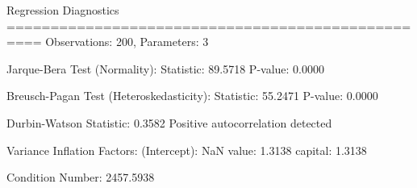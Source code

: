 
Regression Diagnostics
==================================================
Observations: 200, Parameters: 3

Jarque-Bera Test (Normality):
  Statistic: 89.5718
  P-value: 0.0000

Breusch-Pagan Test (Heteroskedasticity):
  Statistic: 55.2471
  P-value: 0.0000

Durbin-Watson Statistic: 0.3582
  Positive autocorrelation detected

Variance Inflation Factors:
  (Intercept): NaN
  value: 1.3138
  capital: 1.3138

Condition Number: 2457.5938
